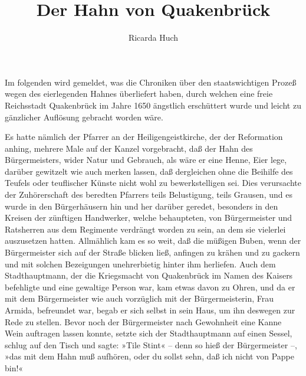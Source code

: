 \usepackage[german,ngerman]{babel}
\usepackage[T1]{fontenc}




\raggedbottom

\author{Ricarda Huch}
\title{Der Hahn von Quakenbrück}
\date{}
\lowertitleback{Diese Ausgabe basiert auf dem 
  \href{http://www.gutenberg.net/}{Project Gutenberg}
  EBook \#27446.}

\maketitle

\pagenum{[9]} Im folgenden wird gemeldet, was die Chroniken über
den staatswichtigen Prozeß wegen des eierlegenden Hahnes
überliefert haben, durch welchen eine freie Reichsstadt Quakenbrück
im Jahre 1650 ängstlich erschüttert wurde und leicht zu gänzlicher
Auflösung gebracht worden wäre.

Es hatte nämlich der Pfarrer an der Heiligengeistkirche, der der
Reformation anhing, mehrere Male auf der Kanzel vorgebracht, daß
der Hahn des Bürgermeisters, wider Natur und Gebrauch, als wäre er
eine Henne, Eier lege, darüber gewitzelt wie auch merken lassen,
daß dergleichen ohne die Beihilfe des Teufels oder teuflischer
Künste nicht wohl zu bewerkstelligen sei. Dies verursachte der
Zuhörerschaft des beredten Pfarrers teils Belustigung, teils
Grausen, und es wurde in den Bürgerhäusern hin und her darüber
geredet, besonders in den Kreisen der zünftigen Handwerker, welche
behaupteten, von Bürgermeister und Ratsherren aus dem Regimente
verdrängt worden zu sein, an dem sie vielerlei auszusetzen hatten.
Allmählich kam es so weit, daß die müßigen Buben, wenn der
Bürgermeister sich auf der Straße blicken ließ, anfingen zu krähen
und zu gackern und mit solchen Bezeigungen unehrerbietig hinter ihm
herliefen. Auch dem Stadthauptmann, der die Kriegsmacht von
Quakenbrück im Namen des Kaisers befehligte und eine \pagenum{[10]}
gewaltige Person war, kam etwas davon zu Ohren, und da er mit dem
Bürgermeister wie auch vorzüglich mit der Bürgermeisterin, Frau
Armida, befreundet war, begab er sich selbst in sein Haus, um ihn
deswegen zur Rede zu stellen. Bevor noch der Bürgermeister nach
Gewohnheit eine Kanne Wein auftragen lassen konnte, setzte sich der
Stadthauptmann auf einen Sessel, schlug auf den Tisch und sagte:
»Tile Stint« – denn so hieß der Bürgermeister –, »das mit dem Hahn
muß aufhören, oder du sollst sehn, daß ich nicht von Pappe bin!«


